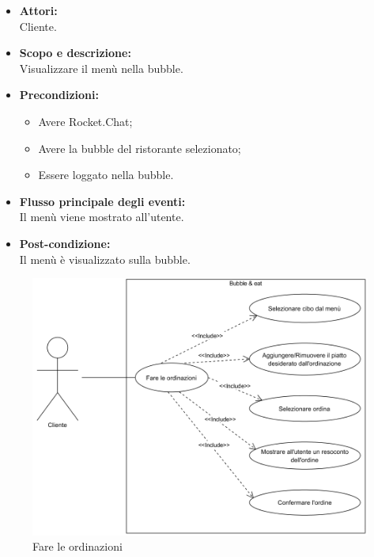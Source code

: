 
\begin{itemize}
	\item \textbf{Attori:}
	\\Cliente.
	\item \textbf{Scopo e descrizione:} 
	\\Visualizzare il menù nella bubble.
	\item \textbf{Precondizioni:}
	\begin{itemize}
		\item Avere Rocket.Chat;
		\item Avere la bubble del ristorante selezionato;
		\item Essere loggato nella bubble.
	\end{itemize}
	\item \textbf{Flusso principale degli eventi:}
	\\Il menù viene mostrato all'utente.
	\item \textbf{Post-condizione:}
	\\Il menù è visualizzato sulla bubble.
\end{itemize}


\begin{figure}[H]
	\centering
	\includegraphics[width=15cm]{../../documenti/AnalisiDeiRequisiti/Diagrammi_img/uc3_3.png}
	\caption{\UCCaption{} Fare le ordinazioni}
\end{figure}

